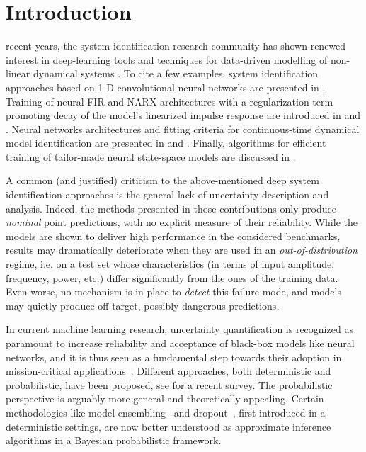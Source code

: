 \documentclass{ifacconf}
\begin{document}
\section{Introduction}
recent years, the system identification research community has shown renewed interest in deep-learning tools and techniques for data-driven modelling of non-linear dynamical systems \cite{ljung2020deep}. %
To cite a few examples, system identification approaches based on 1-D convolutional neural networks are presented in \cite{andersson2019, wu2019deep}.
Training of neural FIR and NARX architectures with a regularization term promoting decay of the model's linearized impulse response are introduced in 
\cite{nfir} and \cite{peeters2022narx}. Neural networks architectures and fitting criteria  for continuous-time dynamical model identification are presented in \cite{Mavkov20} and \cite{Forgione202169}.  
Finally, algorithms for efficient training of tailor-made neural state-space models are discussed in \cite{forgione2020model, beintema2021nonlinear}. 

A common (and justified) criticism to the above-mentioned deep system identification approaches is the general lack of uncertainty description and analysis. Indeed, the methods presented in those contributions only produce \emph{nominal} point predictions, with no explicit measure of their reliability.
While the models are shown to deliver high performance in the considered benchmarks, results may dramatically deteriorate when they are used in an \emph{out-of-distribution} regime, i.e. on a test set whose characteristics (in terms of input amplitude, frequency, power, etc.) differ significantly from the ones of the training data.
Even worse, no mechanism is in place to \emph{detect} this failure mode, and models may quietly produce off-target, possibly dangerous predictions.

In current machine learning research, uncertainty quantification is recognized as paramount to increase reliability and acceptance of black-box models like neural networks, and it is thus seen as a fundamental step towards their adoption in mission-critical
applications~\cite{loquercio2020general}. Different approaches, both deterministic and probabilistic, have been proposed, see \cite{gawlikowski2021survey} for a recent survey. The probabilistic perspective is arguably more general and theoretically appealing. Certain methodologies like model ensembling~\cite{lakshminarayanan2017simple} and dropout~\cite{srivastava2014dropout}, first introduced in a deterministic settings, are now better understood as approximate inference algorithms in a Bayesian probabilistic framework.
\end{document}
